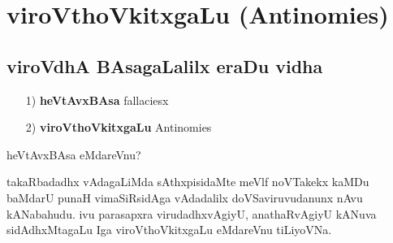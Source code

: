 \chapter{viroVthoVkitxgaLu (\rm Antinomies)}

\section*{viroVdhA BAsagaLalilx eraDu vidha}
\begin{itemize}
\item[{\rm 1)}] {\bf heVtAvxBAsa} {\rm fallaciesx}
\item[{\rm 2)}] {\bf viroVthoVkitxgaLu} {\rm Antinomies}
\end{itemize}

heVtAvxBAsa eMdareVnu?

takaRbadadhx vAdagaLiMda sAthxpisidaMte meVlf noVTakekx kaMDu baMdarU punaH vimaSiRsidAga vAdadalilx doVSaviruvudanunx nAvu kANabahudu. ivu parasapxra virudadhxvAgiyU, anathaRvAgiyU kANuva sidAdhxMtagaLu Iga viroVthoVkitxgaLu eMdareVnu tiLiyoVNa.

